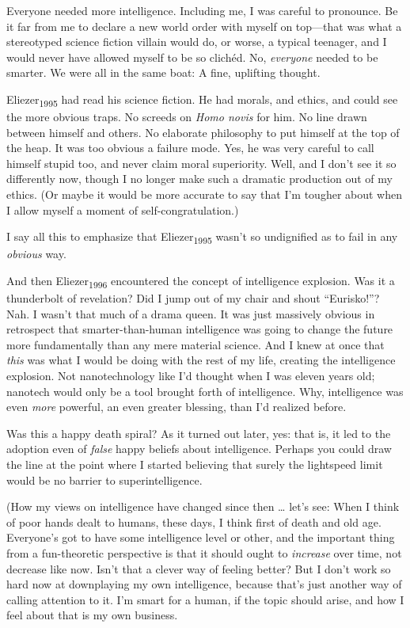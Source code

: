 {
 Everyone needed more intelligence. Including me, I was careful to
pronounce. Be it far from me to declare a new world order with myself
on top---that was what a stereotyped science fiction villain would do,
or worse, a typical teenager, and I would never have allowed myself to
be so clichéd. No, \textit{everyone} needed to be smarter. We were all
in the same boat: A fine, uplifting thought.}

{
 Eliezer\textsubscript{1995} had read his science fiction. He had
morals, and ethics, and could see the more obvious traps. No screeds on
\textit{Homo novis} for him. No line drawn between himself and others.
No elaborate philosophy to put himself at the top of the heap. It was
too obvious a failure mode. Yes, he was very careful to call himself
stupid too, and never claim moral superiority. Well, and I
don't see it so differently now, though I no longer
make such a dramatic production out of my ethics. (Or maybe it would be
more accurate to say that I'm tougher about when I
allow myself a moment of self-congratulation.)}

{
 I say all this to emphasize that Eliezer\textsubscript{1995}
wasn't so undignified as to fail in any
\textit{obvious} way.}

{
 And then Eliezer\textsubscript{1996} encountered the concept of
intelligence explosion. Was it a thunderbolt of revelation? Did I jump
out of my chair and shout
``Eurisko!''? Nah. I
wasn't that much of a drama queen. It was just
massively obvious in retrospect that smarter-than-human intelligence
was going to change the future more fundamentally than any mere
material science. And I knew at once that \textit{this} was what I
would be doing with the rest of my life, creating the intelligence
explosion. Not nanotechnology like I'd thought when I
was eleven years old; nanotech would only be a tool brought forth of
intelligence. Why, intelligence was even \textit{more} powerful, an
even greater blessing, than I'd realized before.}

{
 Was this a happy death spiral? As it turned out later, yes: that
is, it led to the adoption even of \textit{false} happy beliefs about
intelligence. Perhaps you could draw the line at the point where I
started believing that surely the lightspeed limit would be no barrier
to superintelligence.}

{
 (How my views on intelligence have changed since then \ldots
let's see: When I think of poor hands dealt to humans,
these days, I think first of death and old age.
Everyone's got to have some intelligence level or
other, and the important thing from a fun-theoretic perspective is that
it should ought to \textit{increase} over time, not decrease like now.
Isn't that a clever way of feeling better? But I
don't work so hard now at downplaying my own
intelligence, because that's just another way of
calling attention to it. I'm smart for a human, if the
topic should arise, and how I feel about that is my own business.}

